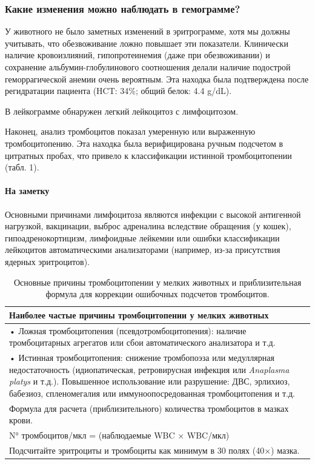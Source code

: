 \documentclass[a4paper,12pt]{book}
\begin{document}
\subsubsection*{Какие изменения можно наблюдать в гемограмме?}
У животного не было заметных изменений в эритрограмме, хотя мы должны учитывать, что обезвоживание ложно повышает эти показатели. Клинически наличие кровоизлияний, гипопротеинемия (даже при обезвоживании) и сохранение альбумин-глобулинового соотношения делали наличие подострой геморрагической анемии очень вероятным. Эта находка была подтверждена после регидратации пациента (HCT: 34\%; общий белок: 4.4 g/dL).

В лейкограмме обнаружен легкий лейкоцитоз с лимфоцитозом.

Наконец, анализ тромбоцитов показал умеренную или выраженную тромбоцитопению. Эта находка была верифицирована ручным подсчетом в цитратных пробах, что привело к классификации истинной тромбоцитопении (табл. 1).

\paragraph{На заметку}
Основными причинами лимфоцитоза являются инфекции с высокой антигенной нагрузкой, вакцинации, выброс адреналина вследствие обращения (у кошек), гипоадренокортицизм, лимфоидные лейкемии или ошибки классификации лейкоцитов автоматическими анализаторами (например, из-за присутствия ядерных эритроцитов).

\begin{table}[htbp]
\centering
\caption{Основные причины тромбоцитопении у мелких животных и приблизительная формула для коррекции ошибочных подсчетов тромбоцитов.}
\begin{tabular}{p{14cm}}
\toprule
Наиболее частые причины тромбоцитопении у мелких животных \\
\midrule
• Ложная тромбоцитопения (псевдотромбоцитопения): наличие тромбоцитарных агрегатов или сбои автоматического анализатора и т.д. \\
• Истинная тромбоцитопения: снижение тромбопоэза или медуллярная недостаточность (идиопатическая, ретровирусная инфекция или \textit{Anaplasma platys} и т.д.). Повышенное использование или разрушение: ДВС, эрлихиоз, бабезиоз, спленомегалия или иммуноопосредованная тромбоцитопения и т.д. \\
\midrule
Формула для расчета (приблизительного) количества тромбоцитов в мазках крови. \\
N° тромбоцитов/мкл = (наблюдаемые WBC × WBC/мкл) \\
Подсчитайте эритроциты и тромбоциты как минимум в 30 полях (40×) мазка. \\
\bottomrule
\end{tabular}
\end{table}
\end{document}
